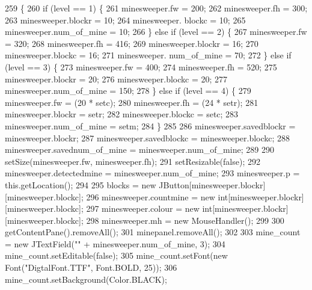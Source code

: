 \begin{DoxyCode}
259                                                                   \{
260         \textcolor{keywordflow}{if} (level == 1) \{
261             minesweeper.fw = 200;
262             minesweeper.fh = 300;
263             minesweeper.blockr = 10;
264             minesweeper. blockc = 10;
265             minesweeper.num\_of\_mine = 10;
266         \} \textcolor{keywordflow}{else} \textcolor{keywordflow}{if} (level == 2) \{
267             minesweeper.fw = 320;
268             minesweeper.fh = 416;
269             minesweeper.blockr = 16;
270             minesweeper.blockc = 16;
271             minesweeper. num\_of\_mine = 70;
272         \} \textcolor{keywordflow}{else} \textcolor{keywordflow}{if} (level == 3) \{
273             minesweeper.fw = 400;
274             minesweeper.fh = 520;
275             minesweeper.blockr = 20;
276             minesweeper.blockc = 20;
277             minesweeper.num\_of\_mine = 150;
278         \} \textcolor{keywordflow}{else} \textcolor{keywordflow}{if} (level == 4) \{
279             minesweeper.fw = (20 * setc);
280             minesweeper.fh = (24 * setr);
281             minesweeper.blockr = setr;
282             minesweeper.blockc = setc;
283             minesweeper.num\_of\_mine = setm;
284         \}
285  
286         minesweeper.savedblockr = minesweeper.blockr;
287         minesweeper.savedblockc = minesweeper.blockc;
288         minesweeper.savednum\_of\_mine = minesweeper.num\_of\_mine;
289  
290         setSize(minesweeper.fw, minesweeper.fh);
291         setResizable(\textcolor{keyword}{false});
292         minesweeper.detectedmine = minesweeper.num\_of\_mine;
293         minesweeper.p = this.getLocation();
294  
295         blocks = \textcolor{keyword}{new} JButton[minesweeper.blockr][minesweeper.blockc];
296         minesweeper.countmine = \textcolor{keyword}{new} \textcolor{keywordtype}{int}[minesweeper.blockr][minesweeper.blockc];
297         minesweeper.colour = \textcolor{keyword}{new} \textcolor{keywordtype}{int}[minesweeper.blockr][minesweeper.blockc];
298         minesweeper.mh = \textcolor{keyword}{new} MouseHandler();
299  
300         getContentPane().removeAll();
301         minepanel.removeAll();
302  
303         mine\_count = \textcolor{keyword}{new} JTextField(\textcolor{stringliteral}{""} + minesweeper.num\_of\_mine, 3);
304         mine\_count.setEditable(\textcolor{keyword}{false});
305         mine\_count.setFont(\textcolor{keyword}{new} Font(\textcolor{stringliteral}{"DigtalFont.TTF"}, Font.BOLD, 25));
306         mine\_count.setBackground(Color.BLACK);

\end{DoxyCode}
